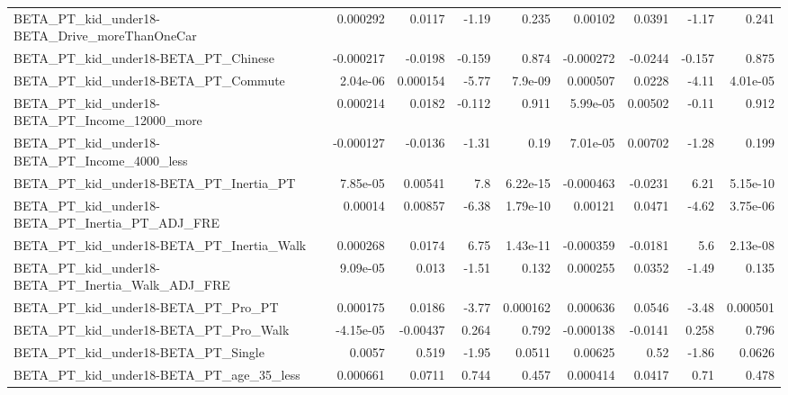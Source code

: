 \begin{tabular}{lrrrrrrrr}
BETA\_PT\_kid\_under18-BETA\_Drive\_moreThanOneCar      &    0.000292 &       0.0117 &    -1.19 &    0.235 &    0.00102 &      0.0391 &        -1.17 &         0.241 \\
BETA\_PT\_kid\_under18-BETA\_PT\_Chinese                &   -0.000217 &      -0.0198 &   -0.159 &    0.874 &  -0.000272 &     -0.0244 &       -0.157 &         0.875 \\
BETA\_PT\_kid\_under18-BETA\_PT\_Commute                &    2.04e-06 &     0.000154 &    -5.77 &  7.9e-09 &   0.000507 &      0.0228 &        -4.11 &      4.01e-05 \\
BETA\_PT\_kid\_under18-BETA\_PT\_Income\_12000\_more      &    0.000214 &       0.0182 &   -0.112 &    0.911 &   5.99e-05 &     0.00502 &        -0.11 &         0.912 \\
BETA\_PT\_kid\_under18-BETA\_PT\_Income\_4000\_less       &   -0.000127 &      -0.0136 &    -1.31 &     0.19 &   7.01e-05 &     0.00702 &        -1.28 &         0.199 \\
BETA\_PT\_kid\_under18-BETA\_PT\_Inertia\_PT             &    7.85e-05 &      0.00541 &      7.8 & 6.22e-15 &  -0.000463 &     -0.0231 &         6.21 &      5.15e-10 \\
BETA\_PT\_kid\_under18-BETA\_PT\_Inertia\_PT\_ADJ\_FRE     &     0.00014 &      0.00857 &    -6.38 & 1.79e-10 &    0.00121 &      0.0471 &        -4.62 &      3.75e-06 \\
BETA\_PT\_kid\_under18-BETA\_PT\_Inertia\_Walk           &    0.000268 &       0.0174 &     6.75 & 1.43e-11 &  -0.000359 &     -0.0181 &          5.6 &      2.13e-08 \\
BETA\_PT\_kid\_under18-BETA\_PT\_Inertia\_Walk\_ADJ\_FRE   &    9.09e-05 &        0.013 &    -1.51 &    0.132 &   0.000255 &      0.0352 &        -1.49 &         0.135 \\
BETA\_PT\_kid\_under18-BETA\_PT\_Pro\_PT                 &    0.000175 &       0.0186 &    -3.77 & 0.000162 &   0.000636 &      0.0546 &        -3.48 &      0.000501 \\
BETA\_PT\_kid\_under18-BETA\_PT\_Pro\_Walk               &   -4.15e-05 &     -0.00437 &    0.264 &    0.792 &  -0.000138 &     -0.0141 &        0.258 &         0.796 \\
BETA\_PT\_kid\_under18-BETA\_PT\_Single                 &      0.0057 &        0.519 &    -1.95 &   0.0511 &    0.00625 &        0.52 &        -1.86 &        0.0626 \\
BETA\_PT\_kid\_under18-BETA\_PT\_age\_35\_less            &    0.000661 &       0.0711 &    0.744 &    0.457 &   0.000414 &      0.0417 &         0.71 &         0.478 \\

\end{tabular}
